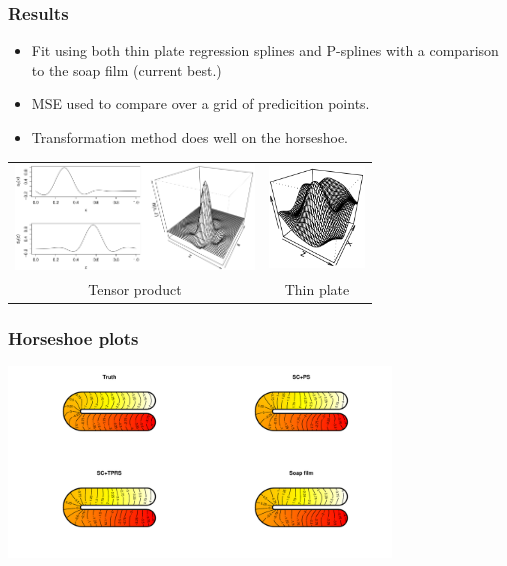 \documentclass[ignorenonframetext]{beamer} %
\newcommand{\bc}{\begin{center}}
\newcommand{\ec}{\end{center}}
\newcommand{\bi}{\begin{itemize}}
\newcommand{\ei}{\end{itemize}}
\begin{document}
\begin{frame}
	\frametitle{Results}
       \bi
         \item Fit using both thin plate regression splines and P-splines with a comparison to the soap film (current best.) 
         \item MSE used to compare over a grid of predicition points.
         \item Transformation method does well on the horseshoe.
        \ei
       \bc\begin{tabular}{@{}cc}
          \includegraphics[width=2.5in]{figs/tensorproduct} & \includegraphics[width=1in]{figs/tprs}\\
          Tensor product & Thin plate\\
       \end{tabular}\ec
\end{frame}


\begin{frame}
	\frametitle{Horseshoe plots}
            \centering
          \includegraphics[width=4in,trim=2in 1in 2in 0.5in]{figs/compsmooth}
\end{frame}
\end{document}
